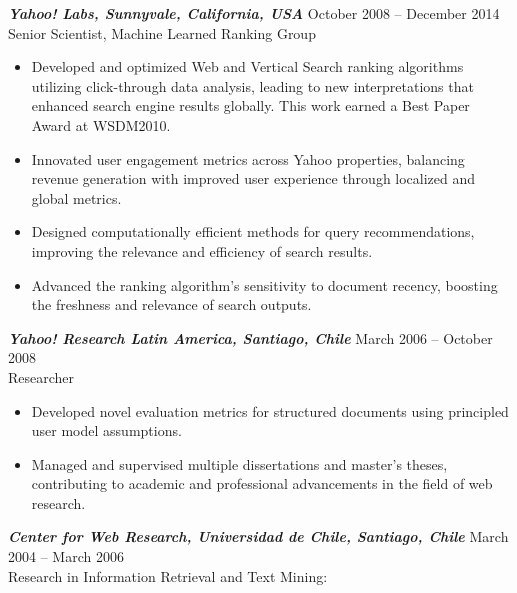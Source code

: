 \documentclass[10pt]{res} %
\begin{document}
\begin{resume}
{\sl \textbf{Yahoo! Labs, Sunnyvale, California, USA}} \hfill October 2008 -- December 2014 \\
Senior Scientist, Machine Learned Ranking Group

\vspace{8pt} 

\begin{itemize}
\item Developed and optimized Web and Vertical Search ranking
  algorithms utilizing click-through data analysis, leading to new
  interpretations that enhanced search engine results globally. This
  work earned a Best Paper Award at WSDM2010.
  
\item Innovated user engagement metrics across Yahoo properties,
  balancing revenue generation with improved user experience through
  localized and global metrics.
  
\item Designed computationally efficient methods for query
  recommendations, improving the relevance and efficiency of search
  results.
  
\item Advanced the ranking algorithm's sensitivity to document
  recency, boosting the freshness and relevance of search outputs.
\end{itemize}

{\sl \textbf{Yahoo! Research Latin America, Santiago, Chile}} \hfill March 2006 -- October 2008 \\
Researcher

\vspace{8pt}

\begin{itemize}
\item Developed novel evaluation metrics for structured documents
  using principled user model assumptions.
  
\item Managed and supervised multiple dissertations and master's
  theses, contributing to academic and professional advancements in
  the field of web research.
\end{itemize}

{\sl \textbf{Center for Web Research, Universidad de Chile, Santiago, Chile}} \hfill March 2004 -- March 2006 \\
Research in Information Retrieval and Text Mining:

\vspace{8pt}


\end{resume}
\end{document}
